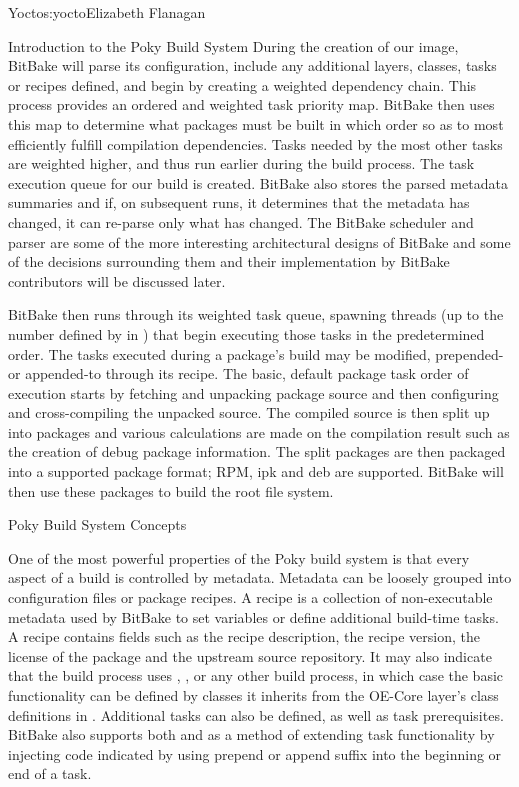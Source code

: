 \begin{aosachapter}{Yocto}{s:yocto}{Elizabeth Flanagan}
\begin{aosasect1}{Introduction to the Poky Build System}
During the creation of our image, BitBake will parse its
configuration, include any additional layers, classes, tasks or
recipes defined, and begin by creating a weighted dependency
chain. This process provides an ordered and weighted task priority
map. BitBake then uses this map to determine what packages must be
built in which order so as to most efficiently fulfill compilation
dependencies. Tasks needed by the most other tasks are weighted higher,
and thus run earlier during the build process. The task execution
queue for our build is created. BitBake also stores the parsed
metadata summaries and if, on subsequent runs, it determines that the
metadata has changed, it can re-parse only what has changed. The
BitBake scheduler and parser are some of the more interesting
architectural designs of BitBake and some of the decisions surrounding
them and their implementation by BitBake contributors will
be discussed later.

BitBake then runs through its weighted task queue, spawning threads
(up to the number defined by  in
) that begin executing those tasks in the
predetermined order. The tasks executed during a package's build may
be modified, prepended- or appended-to through its recipe. The basic,
default package task order of execution starts by fetching and
unpacking package source and then configuring and cross-compiling the
unpacked source. The compiled source is then split up into packages
and various calculations are made on the compilation result such as
the creation of debug package information.  The split packages are
then packaged into a supported package format; RPM, ipk and deb 
are supported. BitBake will then use these packages to build
the root file system.

\begin{aosasect2}{Poky Build System Concepts}

One of the most powerful properties of the
Poky build system is that every aspect of a build is controlled by
metadata. Metadata can be loosely grouped into configuration files or
package recipes. A recipe is a
collection of non-executable
metadata used by BitBake to set variables or define additional 
build-time tasks. A recipe contains fields such as the recipe description,
the recipe version, the license of the package and the upstream
source repository. It may also indicate
that the build process uses , ,  or any
other build process, in which case the basic functionality can be
defined by classes it inherits from
the OE-Core layer's class definitions in .
Additional tasks can also be
defined, as well as task prerequisites. BitBake
also supports both 
and  as a method of extending task functionality by injecting
code indicated by using prepend or append suffix into the beginning
or end of a task.


\end{aosasect2}
\end{aosasect1}
\end{aosachapter}
